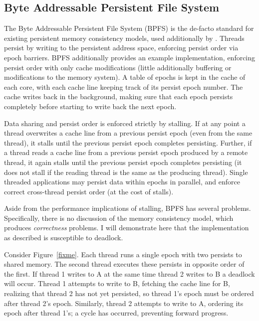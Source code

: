 \subsection{Byte Addressable Persistent File System}
\label{sec:PMC:PersistenceModels:BPFS}

The Byte Addressable Persistent File System (BPFS)  is the de-facto standard for existing persistent memory consistency models, used additionally by .
Threads persist by writing to the persistent address space, enforcing persist order via epoch barriers.
BPFS additionally provides an example implementation, enforcing persist order with only cache modifications (little additionally buffering or modifications to the memory system).
A table of epochs is kept in the cache of each core, with each cache line keeping track of its persist epoch number.
The cache writes back in the background, making sure that each epoch persists completely before starting to write back the next epoch.

Data sharing and persist order is enforced strictly by stalling.
If at any point a thread overwrites a cache line from a previous persist epoch (even from the same thread), it stalls until the previous persist epoch completes persisting.
Further, if a thread reads a cache line from a previous persist epoch produced by a remote thread, it again stalls until the previous persist epoch completes persisting (it does not stall if the reading thread is the same as the producing thread).
Single threaded applications may persist data within epochs in parallel, and enforce correct cross-thread persist order (at the cost of stalls).

Aside from the performance implications of stalling, BPFS has several problems.
Specifically, there is no discussion of the memory consistency model, which produces \emph{correctness} problems.
I will demonstrate here that the implementation as described is susceptible to deadlock.

Consider Figure~\ref{fixme}.
Each thread runs a single epoch with two persists to shared memory.
The second thread executes these persists in opposite order of the first.
If thread 1 writes to A at the same time thread 2 writes to B a deadlock will occur.
Thread 1 attempts to write to B, fetching the cache line for B, realizing that thread 2 has not yet persisted, so thread 1's epoch must be ordered after thread 2's epoch.
Similarly, thread 2 attempts to write to A, ordering its epoch after thread 1's; a cycle has occurred, preventing forward progress.

